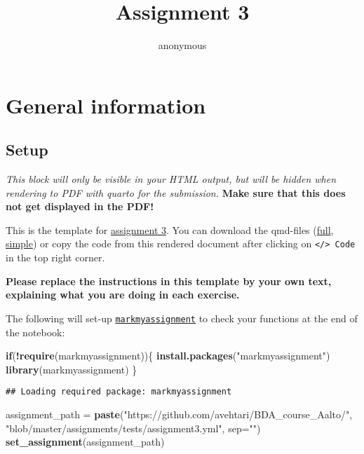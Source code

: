 \documentclass[
]{article}
\title{Assignment 3}
\author{anonymous}
\date{}
\newenvironment{Shaded}{\begin{snugshade}}{\end{snugshade}}
\newcommand{\AttributeTok}[1]{\textcolor[rgb]{0.13,0.29,0.53}{#1}}
\newcommand{\ControlFlowTok}[1]{\textcolor[rgb]{0.13,0.29,0.53}{\textbf{#1}}}
\newcommand{\FunctionTok}[1]{\textcolor[rgb]{0.13,0.29,0.53}{\textbf{#1}}}
\newcommand{\NormalTok}[1]{#1}
\newcommand{\OtherTok}[1]{\textcolor[rgb]{0.56,0.35,0.01}{#1}}
\newcommand{\SpecialCharTok}[1]{\textcolor[rgb]{0.81,0.36,0.00}{\textbf{#1}}}
\newcommand{\StringTok}[1]{\textcolor[rgb]{0.31,0.60,0.02}{#1}}
\begin{document}
\maketitle

\hypertarget{general-information}{%
\section{General information}\label{general-information}}

\hypertarget{setup}{%
\subsection{Setup}\label{setup}}

\emph{This block will only be visible in your HTML output, but will be
hidden when rendering to PDF with quarto for the submission.}
\textbf{Make sure that this does not get displayed in the PDF!}

This is the template for \href{assignment3.html}{assignment 3}. You can
download the qmd-files
(\href{https://avehtari.github.io/BDA_course_Aalto/assignments/template3.qmd}{full},
\href{https://avehtari.github.io/BDA_course_Aalto/assignments/simple_template3.qmd}{simple})
or copy the code from this rendered document after clicking on
\texttt{\textless{}/\textgreater{}\ Code} in the top right corner.

\textbf{Please replace the instructions in this template by your own
text, explaining what you are doing in each exercise.}

The following will set-up
\href{https://github.com/MansMeg/markmyassignment}{\texttt{markmyassignment}}
to check your functions at the end of the notebook:

\begin{Shaded}
\begin{Highlighting}[]
\ControlFlowTok{if}\NormalTok{(}\SpecialCharTok{!}\FunctionTok{require}\NormalTok{(markmyassignment))\{}
    \FunctionTok{install.packages}\NormalTok{(}\StringTok{"markmyassignment"}\NormalTok{)}
    \FunctionTok{library}\NormalTok{(markmyassignment)}
\NormalTok{\}}
\end{Highlighting}
\end{Shaded}

\begin{verbatim}
## Loading required package: markmyassignment
\end{verbatim}

\begin{Shaded}
\begin{Highlighting}[]
\NormalTok{assignment\_path }\OtherTok{=} \FunctionTok{paste}\NormalTok{(}\StringTok{"https://github.com/avehtari/BDA\_course\_Aalto/"}\NormalTok{,}
\StringTok{"blob/master/assignments/tests/assignment3.yml"}\NormalTok{, }\AttributeTok{sep=}\StringTok{""}\NormalTok{)}
\FunctionTok{set\_assignment}\NormalTok{(assignment\_path)    }
\end{Highlighting}
\end{Shaded}
\end{document}

